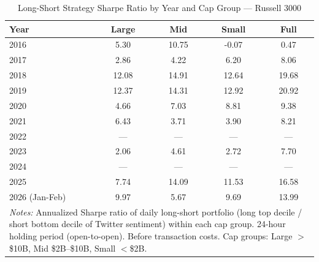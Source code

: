 \begin{table}[htbp]
\centering
\caption{Long-Short Strategy Sharpe Ratio by Year and Cap Group --- Russell 3000}
\label{tab:russel_cap_ls_annual}
\begin{tabular}{lcccc}
\hline\hline
Year & Large & Mid & Small & Full \\
\hline
2016 & 5.30 & 10.75 & -0.07 & 0.47 \\
2017 & 2.86 & 4.22 & 6.20 & 8.06 \\
2018 & 12.08 & 14.91 & 12.64 & 19.68 \\
2019 & 12.37 & 14.31 & 12.92 & 20.92 \\
2020 & 4.66 & 7.03 & 8.81 & 9.38 \\
2021 & 6.43 & 3.71 & 3.90 & 8.21 \\
2022 & --- & --- & --- & --- \\
2023 & 2.06 & 4.61 & 2.72 & 7.70 \\
2024 & --- & --- & --- & --- \\
2025 & 7.74 & 14.09 & 11.53 & 16.58 \\
2026 (Jan-Feb) & 9.97 & 5.67 & 9.69 & 13.99 \\
\hline\hline
\multicolumn{5}{p{0.9\linewidth}}{\footnotesize \textit{Notes:} Annualized Sharpe ratio of daily long-short portfolio (long top decile / short bottom decile of Twitter sentiment) within each cap group. 24-hour holding period (open-to-open). Before transaction costs. Cap groups: Large $>$\$10B, Mid \$2B--\$10B, Small $<$\$2B.} \\
\end{tabular}
\end{table}